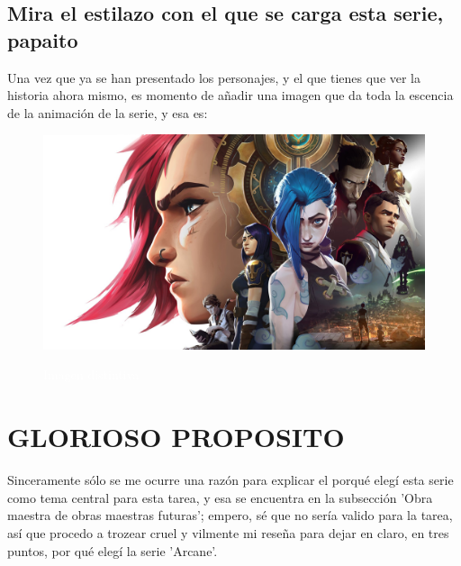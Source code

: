 \documentclass[11pt,a5paper]{article}
\begin{document}
    \subsection*{{\large{\textsf{\hspace{1cm}Mira el estilazo con el que se carga esta serie, papaito}}}}

Una vez que ya se han presentado los personajes, y el que tienes que ver la historia ahora mismo, es momento de añadir una imagen que da toda la escencia de la animación de la serie, y esa es:

\begin{figure}[h]
    \raggedleft
    \caption*{\textcolor{white}{Imagen distintiva}}
    \includegraphics[scale=0.15, angle=15]{Pelicula. Imagenes usadas/Imagen representativa de Arcane.jpg}
    \label{fig:my_label}
\end{figure}

\newpage

    \pagestyle{fancy}
            \fancyhf{}
            \rhead{\textcolor{white}{\thepage}}
            \cfoot{\textcolor{white}{Jordán Aarón Duarte Martínez}}

\section*{\Large{\textsf{\hspace{1.8cm}GLORIOSO PROPOSITO}}}

Sinceramente sólo se me ocurre una razón para explicar el porqué elegí esta serie como tema central para esta tarea, y esa se encuentra en la subsección 'Obra maestra de obras maestras futuras'; empero, sé que no sería valido para la tarea, así que procedo a trozear cruel y vilmente mi reseña para dejar en claro, en tres puntos, por qué elegí la serie 'Arcane'.\newline
\end{document}
